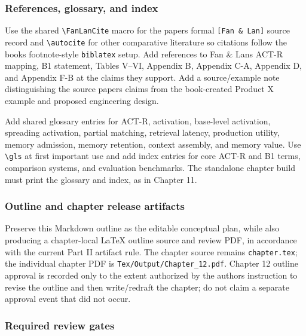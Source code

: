 \subsubsection{References, glossary, and index}\label{references-glossary-and-index}

Use the shared \texttt{\textbackslash{}FanLanCite} macro for the paper\textquotesingle s formal \texttt{{[}Fan\ \&\ Lan{]}} source record and \texttt{\textbackslash{}autocite} for other comparative literature so citations follow the book\textquotesingle s footnote-style \texttt{biblatex} setup. Add references to Fan \& Lan\textquotesingle s ACT-R mapping, B1 statement, Tables V--VI, Appendix B, Appendix C-A, Appendix D, and Appendix F-B at the claims they support. Add a source/example note distinguishing the source paper\textquotesingle s claims from the book-created Product X example and proposed engineering design.

Add shared glossary entries for ACT-R, activation, base-level activation, spreading activation, partial matching, retrieval latency, production utility, memory admission, memory retention, context assembly, and memory value. Use \texttt{\textbackslash{}gls} at first important use and add index entries for core ACT-R and B1 terms, comparison systems, and evaluation benchmarks. The standalone chapter build must print the glossary and index, as in Chapter 11.

\subsubsection{Outline and chapter release artifacts}\label{outline-and-chapter-release-artifacts}

Preserve this Markdown outline as the editable conceptual plan, while also producing a chapter-local LaTeX outline source and review PDF, in accordance with the current Part II artifact rule. The chapter source remains \texttt{chapter.tex}; the individual chapter PDF is \texttt{Tex/Output/Chapter\_12.pdf}. Chapter 12 outline approval is recorded only to the extent authorized by the author\textquotesingle s instruction to revise the outline and then write/redraft the chapter; do not claim a separate approval event that did not occur.

\subsubsection{Required review gates}\label{required-review-gates}

